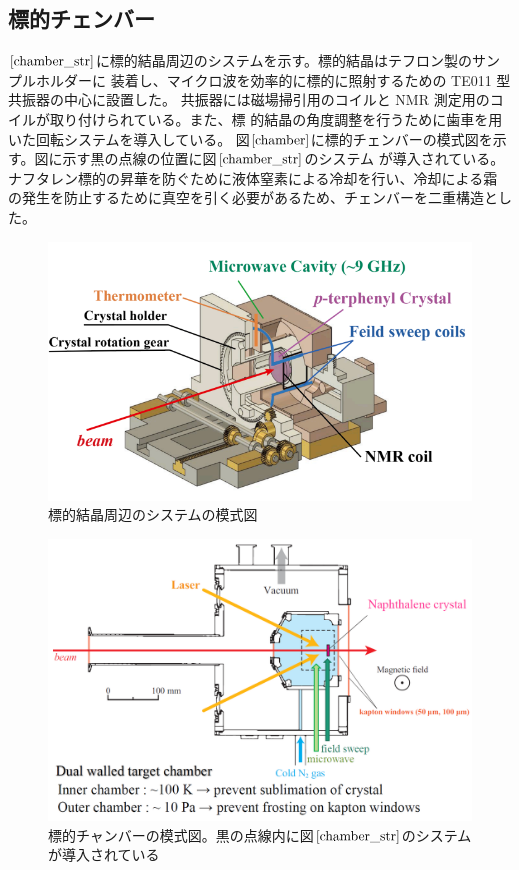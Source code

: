 \subsection{標的チェンバー}
$\ref{chamber_str}$に標的結晶周辺のシステムを示す。標的結晶はテフロン製のサンプルホルダーに
装着し、マイクロ波を効率的に標的に照射するための TE011 型共振器の中心に設置した。
共振器には磁場掃引用のコイルと NMR 測定用のコイルが取り付けられている。また、標
的結晶の角度調整を行うために歯車を用いた回転システムを導入している。
図$\ref{chamber}$に標的チェンバーの模式図を示す。図に示す黒の点線の位置に図$\ref{chamber_str}$のシステム
が導入されている。ナフタレン標的の昇華を防ぐために液体窒素による冷却を行い、冷却による霜
の発生を防止するために真空を引く必要があるため、チェンバーを二重構造とした。


\begin{figure}[ht]
  \centering
  \includegraphics[keepaspectratio, scale=0.8]
       {./chap2/fig/chamber_str.png}
  \caption{標的結晶周辺のシステムの模式図}
  \label{chamber_str}
 \end{figure}

 \begin{figure}[ht]
  \centering
  \includegraphics[keepaspectratio, scale=0.5]
       {./chap2/fig/chamber.png}
  \caption{標的チャンバーの模式図。黒の点線内に図$\ref{chamber_str}$のシステムが導入されている}
  \label{chamber}
 \end{figure}

